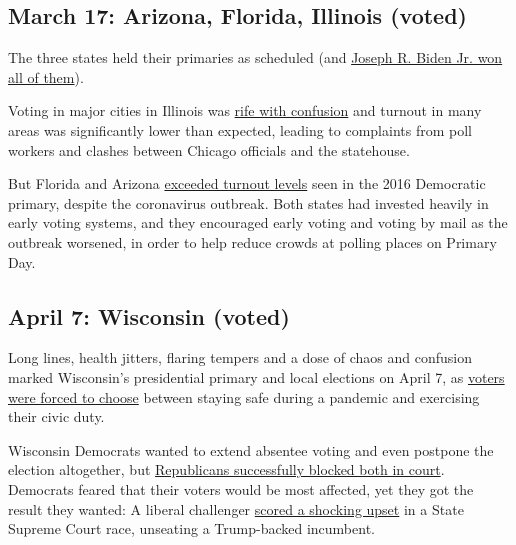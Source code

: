 \hypertarget{march-17-arizona-florida-illinois-voted}{%
\subsection{March 17: Arizona, Florida, Illinois
(voted)}\label{march-17-arizona-florida-illinois-voted}}

The three states held their primaries as scheduled (and
\href{https://www.nytimes.com/2020/03/17/us/politics/biden-florida-illinois-primary.html}{Joseph
R. Biden Jr. won all of them}).

Voting in major cities in Illinois was
\href{https://www.nytimes.com/2020/03/17/us/politics/primary-voter-turnout-2020.html}{rife
with confusion} and turnout in many areas was significantly lower than
expected, leading to complaints from poll workers and clashes between
Chicago officials and the statehouse.

But Florida and Arizona
\href{https://www.nytimes.com/2020/03/17/us/politics/march-17-democratic-primary.html\#link-2e84c23f}{exceeded
turnout levels} seen in the 2016 Democratic primary, despite the
coronavirus outbreak. Both states had invested heavily in early voting
systems, and they encouraged early voting and voting by mail as the
outbreak worsened, in order to help reduce crowds at polling places on
Primary Day.

\hypertarget{april-7-wisconsin-voted}{%
\subsection{April 7: Wisconsin (voted)}\label{april-7-wisconsin-voted}}

Long lines, health jitters, flaring tempers and a dose of chaos and
confusion marked Wisconsin's presidential primary and local elections on
April 7, as
\href{https://www.nytimes.com/2020/04/07/us/politics/wisconsin-election-coronavirus.html}{voters
were forced to choose} between staying safe during a pandemic and
exercising their civic duty.

Wisconsin Democrats wanted to extend absentee voting and even postpone
the election altogether, but
\href{https://www.nytimes.com/2020/04/07/us/politics/wisconsin-pandemic-primary-republicans.html}{Republicans
successfully blocked both in court}. Democrats feared that their voters
would be most affected, yet they got the result they wanted: A liberal
challenger
\href{https://www.nytimes.com/2020/04/13/us/politics/wisconsin-primary-results.html}{scored
a shocking upset} in a State Supreme Court race, unseating a
Trump-backed incumbent.


